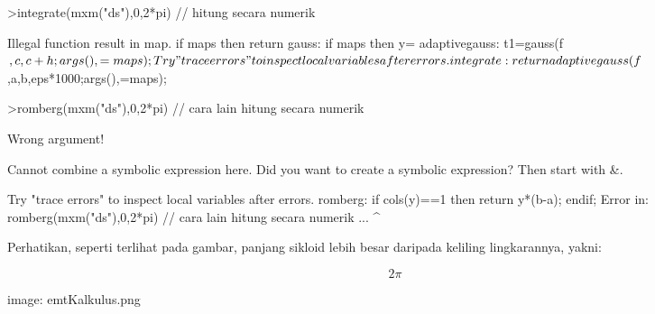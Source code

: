 \documentclass[a4paper,10pt]{article}
\begin{document}
\begin{eulernotebook}
\begin{eulercomment}
\begin{eulercomment}
\begin{eulercomment}
\begin{eulercomment}
\begin{eulercomment}
\begin{eulercomment}
\begin{eulercomment}
\begin{eulercomment}
\begin{eulercomment}
\begin{eulercomment}
\begin{eulercomment}
\begin{eulercomment}
\begin{eulercomment}
\begin{eulercomment}
\begin{eulercomment}
\begin{eulercomment}
\begin{eulercomment}
\begin{eulercomment}
\begin{eulerprompt}
>integrate(mxm("ds"),0,2*pi) // hitung secara numerik
\end{eulerprompt}
\begin{euleroutput}
  Illegal function result in map.
      if maps then return %
  gauss:
      if maps then y=%
  adaptivegauss:
      t1=gauss(f$,c,c+h;args(),=maps);
  Try "trace errors" to inspect local variables after errors.
  integrate:
      return adaptivegauss(f$,a,b,eps*1000;args(),=maps);
\end{euleroutput}
\begin{eulerprompt}
>romberg(mxm("ds"),0,2*pi) // cara lain hitung secara numerik
\end{eulerprompt}
\begin{euleroutput}
  Wrong argument!
  
  Cannot combine a symbolic expression here.
  Did you want to create a symbolic expression?
  Then start with &.
  
  Try "trace errors" to inspect local variables after errors.
  romberg:
      if cols(y)==1 then return y*(b-a); endif;
  Error in:
  romberg(mxm("ds"),0,2*pi) // cara lain hitung secara numerik ...
                           ^
\end{euleroutput}
\begin{eulercomment}
Perhatikan, seperti terlihat pada gambar, panjang sikloid lebih besar
daripada keliling lingkarannya, yakni:\\
\end{eulercomment}
\begin{eulerformula}
\[
2\pi
\]
\end{eulerformula}
\begin{eulercomment}
\begin{eulercomment}
\begin{eulercomment}
image: emtKalkulus.png


\end{eulercomment}
\end{eulercomment}
\end{eulercomment}
\end{eulercomment}
\end{eulercomment}
\end{eulercomment}
\end{eulercomment}
\end{eulercomment}
\end{eulercomment}
\end{eulercomment}
\end{eulercomment}
\end{eulercomment}
\end{eulercomment}
\end{eulercomment}
\end{eulercomment}
\end{eulercomment}
\end{eulercomment}
\end{eulercomment}
\end{eulercomment}
\end{eulercomment}
\end{eulercomment}
\end{eulernotebook}
\end{document}
